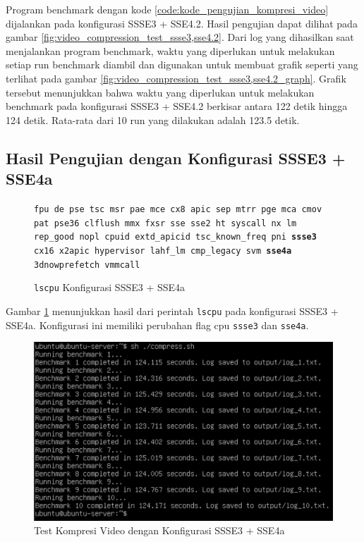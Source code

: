 Program benchmark dengan kode \ref{code:kode_pengujian_kompresi_video} dijalankan pada konfigurasi SSSE3 + SSE4.2. Hasil pengujian dapat dilihat pada gambar \ref{fig:video_compression_test_ssse3,sse4.2}. Dari log yang dihasilkan saat menjalankan program benchmark, waktu yang diperlukan untuk melakukan setiap run benchmark diambil dan digunakan untuk membuat grafik seperti yang terlihat pada gambar \ref{fig:video_compression_test_ssse3,sse4.2_graph}. Grafik tersebut menunjukkan bahwa waktu yang diperlukan untuk melakukan benchmark pada konfigurasi SSSE3 + SSE4.2 berkisar antara 122 detik hingga 124 detik. Rata-rata dari 10 run yang dilakukan adalah 123.5 detik.

\subsection{Hasil Pengujian dengan Konfigurasi SSSE3 + SSE4a}
\begin{figure}
    \texttt{fpu de pse tsc msr pae mce cx8 apic sep mtrr pge mca cmov pat pse36 clflush mmx fxsr sse sse2 ht syscall nx lm rep\_good nopl cpuid extd\_apicid tsc\_known\_freq pni \textbf{ssse3} cx16 x2apic hypervisor lahf\_lm cmp\_legacy svm \textbf{sse4a} 3dnowprefetch vmmcall}
    \caption{\texttt{lscpu} Konfigurasi SSSE3 + SSE4a}
    \label{fig:lscpu_video_compression_test_ssse3,sse4a}
\end{figure}

Gambar \ref{fig:lscpu_video_compression_test_ssse3,sse4a} menunjukkan hasil dari perintah \texttt{lscpu} pada konfigurasi SSSE3 + SSE4a. Konfigurasi ini memiliki perubahan flag cpu \texttt{ssse3} dan \texttt{sse4a}.

\begin{figure}
    \centering
    \includegraphics[width=1\textwidth]
    {assets/pics/video-compression-test/ssse3,sse4a.jpeg}
    \caption{Test Kompresi Video dengan Konfigurasi SSSE3 + SSE4a}
    \label{fig:video_compression_test_ssse3,sse4a}
\end{figure}

